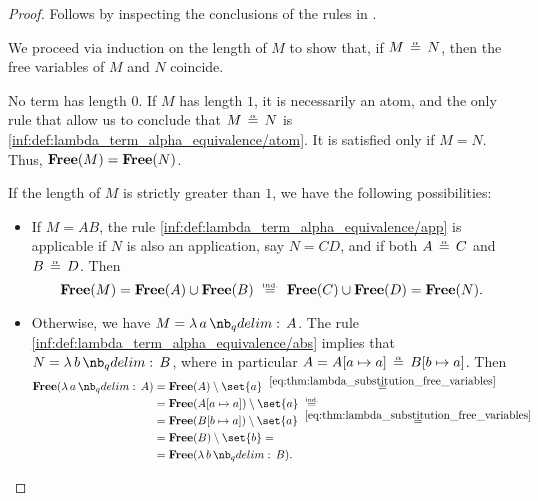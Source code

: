 \begin{proof}
   Follows by inspecting the conclusions of the rules in .

   We proceed via induction on the length of \( M \) to show that, if \( M \aequiv N \), then the free variables of \( M \) and \( N \) coincide.

  No term has length \( 0 \). If \( M \) has length \( 1 \), it is necessarily an atom, and the only rule that allow us to conclude that \( M \aequiv N \) is \ref{inf:def:lambda_term_alpha_equivalence/atom}. It is satisfied only if \( M = N \). Thus, \( \op*{Free}(M) = \op*{Free}(N) \).

  If the length of \( M \) is strictly greater than \( 1 \), we have the following possibilities:
  \begin{itemize}
    \item If \( M = AB \), the rule \ref{inf:def:lambda_term_alpha_equivalence/app} is applicable if \( N \) is also an application, say \( N = CD \), and if both \( A \aequiv C \) and \( B \aequiv D \). Then
    \begin{equation*}
      \op*{Free}(M)
      =
      \op*{Free}(A) \cup \op*{Free}(B)
      \reloset{\T{ind.}} =
      \op*{Free}(C) \cup \op*{Free}(D)
      =
      \op*{Free}(N).
    \end{equation*}

    \item Otherwise, we have \( M = \qabs a A \). The rule \ref{inf:def:lambda_term_alpha_equivalence/abs} implies that \( N = \qabs b B \), where in particular \( A = A[a \mapsto a] \aequiv B[b \mapsto a] \). Then
    \begin{align*}
      \op*{Free}(\qabs a A)
      &=
      \op*{Free}(A) \setminus \set{ a }
      \reloset {\eqref{eq:thm:lambda_substitution_free_variables}} = \\ &=
      \op*{Free}(A[a \mapsto a]) \setminus \set{ a }
      \reloset{\T{ind.}} = \\ &=
      \op*{Free}(B[b \mapsto a]) \setminus \set{ a }
      \reloset {\eqref{eq:thm:lambda_substitution_free_variables}} = \\ &=
      \op*{Free}(B) \setminus \set{ b }
      = \\ &=
      \op*{Free}(\qabs b B).
    \end{align*}
  \end{itemize}


\end{proof}
